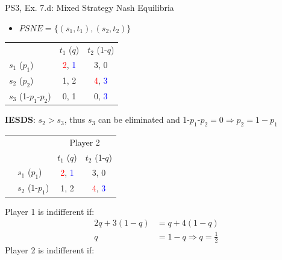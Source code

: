 \begin{frame}{PS3, Ex. 7.d: Mixed Strategy Nash Equilibria}
  \begin{multicols}{2}
    \begin{itemize}
      \item[(d)] $PSNE=\{(s_1,t_1),(s_2,t_2)\}$
    \end{itemize}
    \vspace{-8pt}
    \begin{table}
      \begin{tabular}{l|c|c|}
          \multicolumn{1}{c}{}  & \multicolumn{1}{c}{$t_1$ ($q$)} & \multicolumn{1}{c}{$t_2$ (1-$q$)} \\\cline{2-3}
          $s_1$ ($p_1$)         & \textcolor{red}{2}, \textcolor{blue}{1} & 3, 0 \\\cline{2-3}
          $s_2$ ($p_2$)         & 1, 2 & \textcolor{red}{4}, \textcolor{blue}{3} \\\cline{2-3}
          $s_3$ (1-$p_1$-$p_2$) & 0, 1 & 0, \textcolor{blue}{3} \\\cline{2-3}
      \end{tabular}
    \end{table}
    \vspace{-2pt}
    \textbf{IESDS}: $s_2>s_3$, thus $s_3$ can be eliminated and 1-$p_1$-$p_2=0\Rightarrow p_2=1-p_1$
    \vspace{-6pt}
    \begin{table}
      \begin{tabular}{cl|c|c|}
        & \multicolumn{1}{c}{} & \multicolumn{2}{c}{\color{blue}Player 2}\\
        \parbox[t]{1mm}{}
        &   &  &  \\
        & $s_1$ ($p_1$)  & \textcolor{red}{2}, \textcolor{blue}{1} & 3, 0 \\
        & $s_2$ (1-$p_1$)& 1, 2 & \textcolor{red}{4}, \textcolor{blue}{3} \\
      \end{tabular}
    \end{table}
    Player 1 is indifferent if:
    \begin{align*}
      2q+3(1-q) &= q+4(1-q) \\
      q &= 1-q \Rightarrow q = \frac{1}{2}
    \end{align*}
    Player 2 is indifferent if:
    \begin{align*}

\end{align*}
\end{multicols}
\end{frame}
